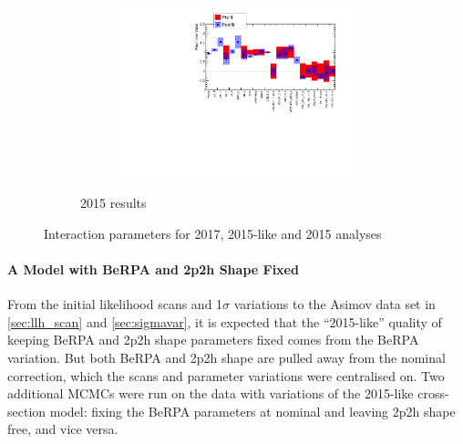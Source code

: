 \begin{figure}[h]
	\begin{subfigure}[t]{\textwidth}
		\centering
		\begin{subfigure}[t]{0.5\textwidth}
			\includegraphics[width=\textwidth, trim={0mm 0mm 0mm 0mm}, clip]{figures/official/banff_data_paramplot_20160408_03.pdf}
		\end{subfigure}
		\caption{2015 results}
	\end{subfigure}
	
	\caption{Interaction parameters for 2017, 2015-like and 2015 analyses}
	\label{fig:xsec_data_2015like}
\end{figure}

\paragraph{A Model with BeRPA and 2p2h Shape Fixed}
From the initial likelihood scans and 1$\sigma$ variations to the Asimov data set in \autoref{sec:llh_scan} and \autoref{sec:sigmavar}, it is expected that the ``2015-like'' quality of keeping BeRPA and 2p2h shape parameters fixed comes from the BeRPA variation. But both BeRPA and 2p2h shape are pulled away from the nominal correction, which the scans and parameter variations were centralised on. Two additional MCMCs were run on the data with variations of the 2015-like cross-section model: fixing the BeRPA parameters at nominal and leaving 2p2h shape free, and vice versa. 

